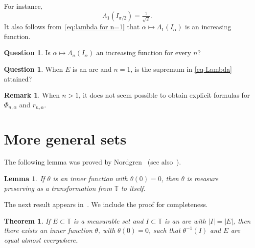 \documentclass[11pt,reqno]{amsart}
\numberwithin{equation}{section}
\theoremstyle{plain}
\newtheorem{Theorem}[equation]{Theorem}
\newtheorem{Lemma}[equation]{Lemma}
\theoremstyle{definition}
\newtheorem{Remark}[equation]{Remark}
\newtheorem{Question}[equation]{Question}
\begin{document}
For instance, 
$$\Lambda_1(I_{\pi/2}) = \tfrac{1}{\sqrt{2}}.$$ It also follows from~\eqref{eq:lambda for n=1} that 
$\alpha \mapsto \Lambda_{1}(I_{\alpha})$ is an increasing function. 

\begin{Question}
Is $\alpha \mapsto \Lambda_{n}(I_{\alpha})$ an increasing function for every $n$? 
\end{Question}

\begin{Question}
When $E$ is an arc and $n=1$, is the supremum in \eqref{eq-Lambda} attained?
\end{Question}

\begin{Remark}
 When $n > 1$, it does not seem possible to obtain explicit formulas for $\Phi_{n, \alpha}$ and $r_{n, \alpha}$.
\end{Remark}
 
\section{More general sets}\label{se:more general sets}

The following lemma was proved by Nordgren~\cite{Nordgren} (see also~\cite[Theorem 7.4.1, Remark 9.4.6]{CMR}).

\begin{Lemma}\label{le:theta(0)=0}
 If $\theta$ is an inner function with $\theta(0)=0$, then $\theta$ is measure preserving as a transformation from ${\mathbb{T}}$ to itself.
\end{Lemma}

The next result appears in~\cite[Appendix]{Qiu}. We include the proof for completeness.

\begin{Theorem}\label{th:interpolation}
If $E\subset{\mathbb{T}}$ is a measurable set and $I\subset{\mathbb{T}}$ is an arc with $|I|=|E|$, then there exists an inner function $\theta$, with $\theta(0)=0$, such that  $\theta^{-1}(I)$ and $E$ are equal almost everywhere.
\end{Theorem}
\end{document}
